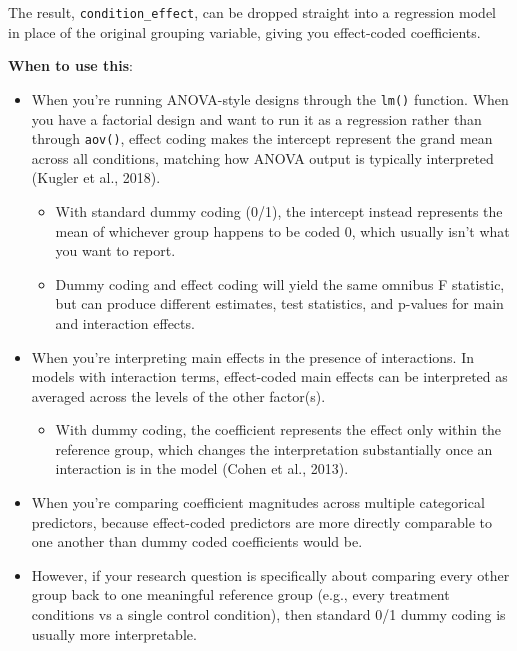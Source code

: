 \documentclass[
  letterpaper,
  DIV=11,
  numbers=noendperiod]{scrreprt}
\providecommand{\tightlist}{%
  \setlength{\itemsep}{0pt}\setlength{\parskip}{0pt}}\usepackage{longtable,booktabs,array}
\begin{document}
The result, \texttt{condition\_effect}, can be dropped straight into a
regression model in place of the original grouping variable, giving you
effect-coded coefficients.

\textbf{When to use this}:

\begin{itemize}
\item
  When you're running ANOVA-style designs through the \texttt{lm()}
  function. When you have a factorial design and want to run it as a
  regression rather than through \texttt{aov()}, effect coding makes the
  intercept represent the grand mean across all conditions, matching how
  ANOVA output is typically interpreted (Kugler et al., 2018).

  \begin{itemize}
  \item
    With standard dummy coding (0/1), the intercept instead represents
    the mean of whichever group happens to be coded 0, which usually
    isn't what you want to report.
  \item
    Dummy coding and effect coding will yield the same omnibus F
    statistic, but can produce different estimates, test statistics, and
    p-values for main and interaction effects.
  \end{itemize}
\item
  When you're interpreting main effects in the presence of interactions.
  In models with interaction terms, effect-coded main effects can be
  interpreted as averaged across the levels of the other factor(s).

  \begin{itemize}
  \tightlist
  \item
    With dummy coding, the coefficient represents the effect only within
    the reference group, which changes the interpretation substantially
    once an interaction is in the model (Cohen et al., 2013).
  \end{itemize}
\item
  When you're comparing coefficient magnitudes across multiple
  categorical predictors, because effect-coded predictors are more
  directly comparable to one another than dummy coded coefficients would
  be.
\item
  However, if your research question is specifically about comparing
  every other group back to one meaningful reference group (e.g., every
  treatment conditions vs a single control condition), then standard 0/1
  dummy coding is usually more interpretable.
\end{itemize}
\end{document}
